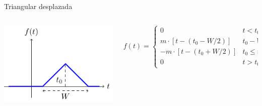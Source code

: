 \documentclass[aspectratio=169, usenames,svgnames,dvipsnames]{beamer}
\begin{document}
\begin{frame}[label={sec:org31d143e}]{Triangular desplazada}
\begin{columns}
\begin{column}{0.4\columnwidth}
\begin{center}
\includegraphics[width=.9\linewidth]{../figs/triangular_t0.pdf}
\end{center}
\end{column}

\begin{column}{0.6\columnwidth}
\[
  f(t) = %
  \begin{cases}
    0 & t < t_0 - W/2\\
    m \cdot [t - (t_0 -  W/2)]  & t_0 - W/2 \leq t \leq t_0\\
    -m \cdot [t - (t_0 + W/2)]  & t_0 \leq t \leq t_0 + W/2\\
    0  & t > t_0 + W/2
  \end{cases}
  \]
\end{column}
\end{columns}
\end{frame}
\end{document}

